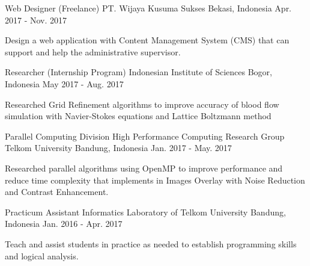 \begin{cventries}

  \cventry
    {Web Designer (Freelance)} %
    {PT. Wijaya Kusuma Sukses} %
    {Bekasi, Indonesia} %
    {Apr. 2017 - Nov. 2017} %
    {
      \begin{cvitems} %
        \item {Design a web application with Content Management System (CMS) that can support and help the administrative supervisor.}
      \end{cvitems}
    }

  \cventry
    {Researcher (Internship Program)} %
    {Indonesian Institute of Sciences} %
    {Bogor, Indonesia} %
    {May 2017 - Aug. 2017} %
    {
      \begin{cvitems} %
        \item {Researched Grid Refinement algorithms to improve accuracy of blood flow simulation with Navier-Stokes equations and Lattice Boltzmann method}
      \end{cvitems}
    }

  \cventry
    {Parallel Computing Division} %
    {High Performance Computing Research Group Telkom University} %
    {Bandung, Indonesia} %
    {Jan. 2017 - May. 2017} %
    {
      \begin{cvitems} %
        \item {Researched parallel algorithms using OpenMP to improve performance and reduce time complexity that implements in Images Overlay with Noise Reduction and Contrast Enhancement.}
      \end{cvitems}
    }

  \cventry
    {Practicum Assistant} %
    {Informatics Laboratory of Telkom University} %
    {Bandung, Indonesia} %
    {Jan. 2016 - Apr. 2017} %
    {
      \begin{cvitems} %
        \item {Teach and assist students in practice as needed to establish programming skills and logical analysis.}
      \end{cvitems}
    }


\end{cventries}
